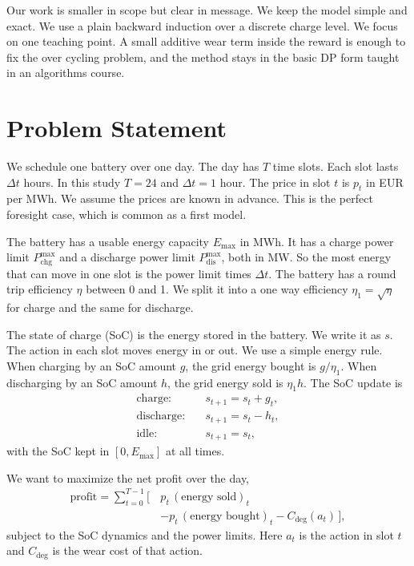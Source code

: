 \documentclass[conference,a4paper]{IEEEtran}
\begin{document}
Our work is smaller in scope but clear in message. We keep the model simple
and exact. We use a plain backward induction over a discrete charge level. We
focus on one teaching point. A small additive wear term inside the reward is
enough to fix the over cycling problem, and the method stays in the basic DP
form taught in an algorithms course.

\section{Problem Statement}\label{sec:problem}
We schedule one battery over one day. The day has $T$ time slots. Each slot
lasts $\Delta t$ hours. In this study $T=24$ and $\Delta t = 1$ hour. The
price in slot $t$ is $p_t$ in EUR per MWh. We assume the prices are known in
advance. This is the perfect foresight case, which is common as a first model.

The battery has a usable energy capacity $E_{\max}$ in MWh. It has a charge
power limit $P_{\text{chg}}^{\max}$ and a discharge power limit
$P_{\text{dis}}^{\max}$, both in MW. So the most energy that can move in one
slot is the power limit times $\Delta t$. The battery has a round trip
efficiency $\eta$ between 0 and 1. We split it into a one way efficiency
$\eta_1 = \sqrt{\eta}$ for charge and the same for discharge.

The state of charge (SoC) is the energy stored in the battery. We write it as
$s$. The action in each slot moves energy in or out. We use a simple energy
rule. When charging by an SoC amount $g$, the grid energy bought is
$g/\eta_1$. When discharging by an SoC amount $h$, the grid energy sold is
$\eta_1 h$. The SoC update is
\begin{align}
\text{charge:}\quad & s_{t+1} = s_t + g_t,\\
\text{discharge:}\quad & s_{t+1} = s_t - h_t,\\
\text{idle:}\quad & s_{t+1} = s_t,
\end{align}
with the SoC kept in $[0, E_{\max}]$ at all times.

We want to maximize the net profit over the day,
\begin{equation}
\begin{aligned}
\text{profit} = \sum_{t=0}^{T-1}\Big[\,
& p_t\,(\text{energy sold})_t\\[-2pt]
& - p_t\,(\text{energy bought})_t - C_{\text{deg}}(a_t) \,\Big],
\end{aligned}
\end{equation}
subject to the SoC dynamics and the power limits. Here $a_t$ is the action in
slot $t$ and $C_{\text{deg}}$ is the wear cost of that action.
\end{document}
